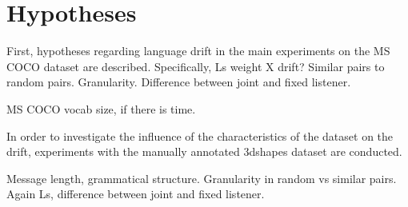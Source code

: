 \section{Hypotheses}

First, hypotheses regarding language drift in the main experiments on the MS COCO dataset are described.
Specifically, Ls weight X drift?
Similar pairs to random pairs. Granularity.
Difference between joint and fixed listener.

MS COCO vocab size, if there is time.

In order to investigate the influence of the characteristics of the dataset on the drift, experiments with the manually annotated 3dshapes dataset are conducted.

Message length, grammatical structure. 
Granularity in random vs similar pairs.
Again Ls, difference between joint and fixed listener.
